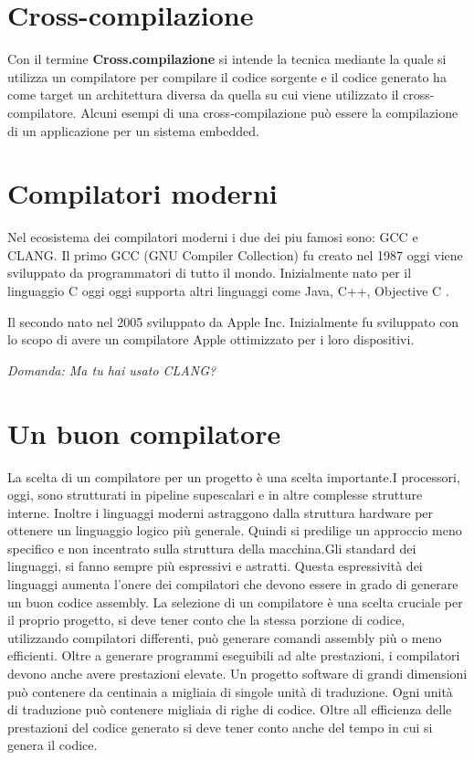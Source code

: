 \documentclass[12pt,a4paper]{report}
\begin{document}
\section{Cross-compilazione}
\label{Sec:Cross}
Con il termine \textbf{Cross.compilazione} si intende la tecnica mediante la quale si utilizza un compilatore per compilare il codice sorgente e il codice generato ha come target un architettura diversa da quella su cui viene utilizzato il cross-compilatore.  Alcuni esempi di una cross-compilazione può essere la compilazione di un applicazione per un sistema embedded. 


\section{Compilatori moderni}
Nel ecosistema dei compilatori moderni i due dei piu famosi sono: GCC e CLANG.
Il primo GCC (GNU Compiler Collection) fu creato nel 1987 oggi viene sviluppato da programmatori di tutto il mondo. Inizialmente nato per il linguaggio C oggi oggi supporta altri linguaggi come Java, C++, Objective C \cite{GCCstory}.

Il secondo nato nel 2005 sviluppato da Apple Inc.  Inizialmente fu sviluppato con lo scopo di avere un compilatore Apple ottimizzato per i loro dispositivi\cite{ClangStory}.

\textit{Domanda: Ma tu hai usato CLANG?} 

\section{Un buon compilatore} %
La scelta di un compilatore per un progetto è una scelta importante.I processori, oggi, sono strutturati in pipeline supescalari e in altre complesse strutture interne. Inoltre i linguaggi moderni astraggono dalla struttura hardware per ottenere un linguaggio logico più generale. Quindi si predilige un approccio meno specifico e non incentrato sulla struttura della macchina.Gli standard dei linguaggi, si fanno  sempre più espressivi e astratti.  Questa espressività dei linguaggi aumenta l'onere dei compilatori che devono essere in grado di generare un buon codice assembly. La selezione di un compilatore è una scelta cruciale per il proprio progetto, si deve tener conto che la stessa porzione di codice, utilizzando compilatori differenti, può generare comandi assembly più o meno efficienti.
Oltre a generare programmi eseguibili ad alte prestazioni, i compilatori devono anche avere prestazioni elevate. Un progetto software di grandi dimensioni  può contenere da centinaia a migliaia di singole unità di traduzione. Ogni unità di traduzione può contenere migliaia di righe di codice.  Oltre all efficienza delle prestazioni del codice generato si deve tener conto anche del tempo in cui si genera il codice.
\end{document}
